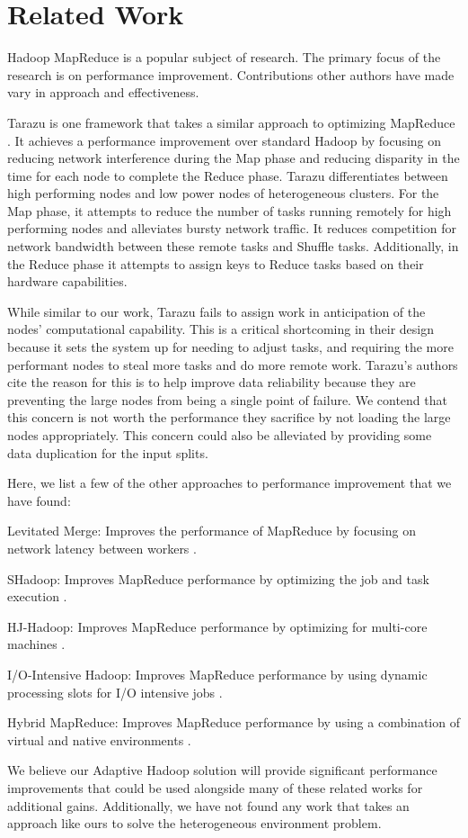 \section{Related Work}
\label{section:relatedwork}
Hadoop MapReduce is a popular subject of research. The primary focus of the research
is on performance improvement. Contributions other authors have made vary in
approach and effectiveness.

Tarazu is one framework that takes a similar approach to optimizing MapReduce \cite{Tarazu}.
It achieves a performance improvement over standard Hadoop by focusing on reducing network
interference during the Map phase and reducing disparity in the time for each node to complete
the Reduce phase. Tarazu differentiates between high performing nodes and low power nodes of
heterogeneous clusters. For the Map phase, it attempts to reduce the number of tasks running
remotely for high performing nodes and alleviates bursty network traffic. It reduces competition
for network bandwidth between these remote tasks and Shuffle tasks. Additionally, in the Reduce phase it attempts to
assign keys to Reduce tasks based on their hardware capabilities.

While similar to our work, Tarazu fails to assign work in anticipation of the nodes' computational
capability. This is a critical shortcoming in their design because it sets the system up
for needing to adjust tasks, and requiring the more performant nodes to steal more tasks
and do more remote work. Tarazu's authors cite the reason for this is to help improve data
reliability because they are preventing the large nodes from being a single point of failure.
We contend that this concern is not worth the performance they sacrifice by not loading the
large nodes appropriately. This concern could also be alleviated by providing some data duplication
for the input splits.

Here, we list a few of the other approaches to performance improvement that we have found:
\begin{description}
  \item{Levitated Merge:} Improves the performance of MapReduce by focusing on network latency between workers \cite{LevitatedMerge}.
  \item{SHadoop:} Improves MapReduce performance by optimizing the job and task execution \cite{SHadoop}.
  \item{HJ-Hadoop:} Improves MapReduce performance by optimizing for multi-core machines \cite{HJHadoop}.
  \item{I/O-Intensive Hadoop:} Improves MapReduce performance by using dynamic processing slots for I/O intensive jobs \cite{IOIntensiveHadoop}.
  \item{Hybrid MapReduce:} Improves MapReduce performance by using a combination of virtual and native environments \cite{HybridMR}.
\end{description}

We believe our Adaptive Hadoop solution will provide significant performance improvements
that could be used alongside many of these related works for additional gains. Additionally,
we have not found any work that takes an approach like ours to solve the heterogeneous
environment problem.